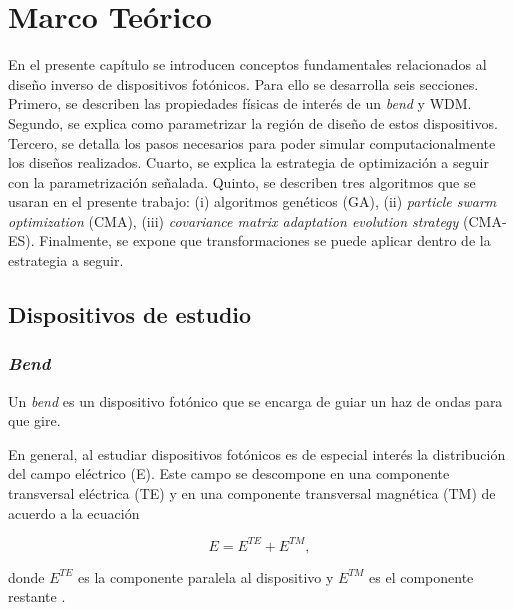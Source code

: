 \chapter{Marco  Teórico}

En el presente capítulo se introducen conceptos fundamentales relacionados al diseño inverso de dispositivos fotónicos.
Para ello se desarrolla seis secciones. 
Primero, se describen las propiedades físicas de interés de un \emph{bend} y WDM.
Segundo, se explica como parametrizar la región de diseño de estos
dispositivos.
Tercero, se detalla los pasos necesarios para poder simular computacionalmente
los diseños realizados.
Cuarto, se explica la estrategia de optimización a seguir con la
parametrización señalada.
Quinto, se describen tres algoritmos que se usaran en el presente trabajo: (i)
algoritmos genéticos (GA), (ii) \emph{particle swarm optimization} (CMA), (iii)
\emph{covariance matrix adaptation evolution strategy} (CMA-ES).
Finalmente, se expone que transformaciones se puede aplicar dentro de la
estrategia a seguir.


\section{Dispositivos de estudio}

\subsection{\emph{Bend}}

Un \emph{bend} es un dispositivo fotónico que se encarga de guiar un haz de ondas para que gire.

En general, al estudiar dispositivos fotónicos es de especial interés la
distribución del campo eléctrico (E). 
Este campo se descompone en una componente transversal eléctrica (TE) y en una componente transversal magnética (TM) de acuerdo a la ecuación

\begin{equation}
  E = E^{TE} + E^{TM},
\label{eq:field}
\end{equation}

donde $E^{TE}$ es la componente paralela al dispositivo y $E^{TM}$ es el componente restante \citep{Hohenester2020}. 

